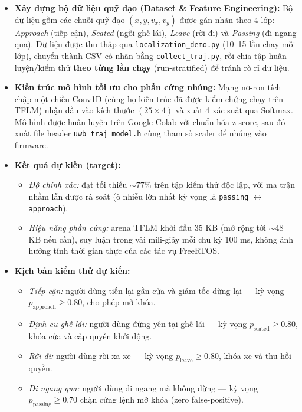 \begin{itemize}
    \item \textbf{Xây dựng bộ dữ liệu quỹ đạo (Dataset \& Feature Engineering):} Bộ dữ liệu gồm các chuỗi quỹ đạo $(x, y, v_x, v_y)$ được gán nhãn theo 4 lớp: \textit{Approach} (tiếp cận), \textit{Seated} (ngồi ghế lái), \textit{Leave} (rời đi) và \textit{Passing} (đi ngang qua). Dữ liệu được thu thập qua \texttt{localization\_demo.py} (10--15 lần chạy mỗi lớp), chuyển thành CSV có nhãn bằng \texttt{collect\_traj.py}, rồi chia tập huấn luyện/kiểm thử \textbf{theo từng lần chạy} (run-stratified) để tránh rò rỉ dữ liệu.

    \item \textbf{Kiến trúc mô hình tối ưu cho phần cứng nhúng:} Mạng nơ-ron tích chập một chiều Conv1D (cùng họ kiến trúc đã được kiểm chứng chạy trên TFLM) nhận đầu vào kích thước $(25 \times 4)$ và xuất 4 xác suất qua Softmax. Mô hình được huấn luyện trên Google Colab với chuẩn hóa z-score, sau đó xuất file header \texttt{uwb\_traj\_model.h} cùng tham số scaler để nhúng vào firmware.

    \item \textbf{Kết quả dự kiến (target):}
    \begin{itemize}
        \item \textit{Độ chính xác:} đạt tối thiểu $\sim 77\%$ trên tập kiểm thử độc lập, với ma trận nhầm lẫn được rà soát (ô nhiễu lớn nhất kỳ vọng là \texttt{passing} $\leftrightarrow$ \texttt{approach}).
        \item \textit{Hiệu năng phần cứng:} arena TFLM khởi đầu 35 KB (mở rộng tới $\sim 48$ KB nếu cần), suy luận trong vài mili-giây mỗi chu kỳ 100 ms, không ảnh hưởng tính thời gian thực của các tác vụ FreeRTOS.
    \end{itemize}

    \item \textbf{Kịch bản kiểm thử dự kiến:}
    \begin{itemize}
        \item \textit{Tiếp cận:} người dùng tiến lại gần cửa và giảm tốc dừng lại --- kỳ vọng $p_{\text{approach}} \ge 0.80$, cho phép mở khóa.
        \item \textit{Định cư ghế lái:} người dùng đứng yên tại ghế lái --- kỳ vọng $p_{\text{seated}} \ge 0.80$, khóa cửa và cấp quyền khởi động.
        \item \textit{Rời đi:} người dùng rời xa xe --- kỳ vọng $p_{\text{leave}} \ge 0.80$, khóa xe và thu hồi quyền.
        \item \textit{Đi ngang qua:} người dùng đi ngang mà không dừng --- kỳ vọng $p_{\text{passing}} \ge 0.70$ chặn cứng lệnh mở khóa (zero false-positive).
    \end{itemize}
\end{itemize}



